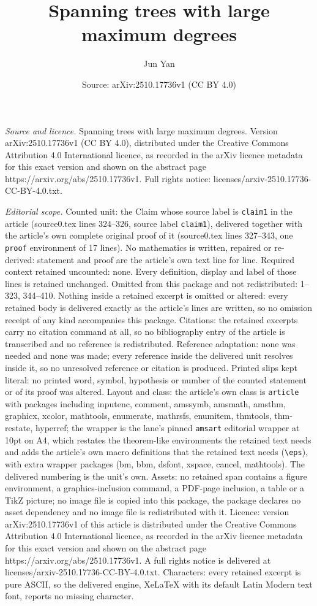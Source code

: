 \documentclass[10pt,a4paper]{amsart}
\title[Spanning trees with large maximum degrees]{Spanning trees with large maximum degrees}
\author{Jun Yan}
\date{Source: arXiv:2510.17736v1 (CC BY 4.0)}
\begin{document}
\maketitle

\noindent\emph{Source and licence.} Spanning trees with large maximum degrees. Version arXiv:2510.17736v1 (CC BY 4.0), distributed under the Creative Commons Attribution 4.0 International licence, as recorded in the arXiv licence metadata for this exact version and shown on the abstract page https://arxiv.org/abs/2510.17736v1. Full rights notice: licenses/arxiv-2510.17736-CC-BY-4.0.txt.\par\smallskip

\noindent\textit{Editorial scope.} Counted unit: the Claim whose source label is \texttt{claim1} in the article (source0.tex lines 324--326, source label \texttt{claim1}), delivered together with the article's own complete original proof of it (source0.tex lines 327--343, one \texttt{proof} environment of 17 lines). No mathematics is written, repaired or re-derived: statement and proof are the article's own text line for line. Required context retained uncounted: none. Every definition, display and label of those lines is retained unchanged. Omitted from this package and not redistributed: 1--323, 344--410. Nothing inside a retained excerpt is omitted or altered: every retained body is delivered exactly as the article's lines are written, so no omission receipt of any kind accompanies this package. Citations: the retained excerpts carry no citation command at all, so no bibliography entry of the article is transcribed and no reference is redistributed. Reference adaptation: none was needed and none was made; every reference inside the delivered unit resolves inside it, so no unresolved reference or citation is produced. Printed slips kept literal: no printed word, symbol, hypothesis or number of the counted statement or of its proof was altered. Layout and class: the article's own class is \texttt{article} with packages including inputenc, comment, amssymb, amsmath, amsthm, graphicx, xcolor, mathtools, enumerate, mathrsfs, enumitem, thmtools, thm-restate, hyperref; the wrapper is the lane's pinned \texttt{amsart} editorial wrapper at 10pt on A4, which restates the theorem-like environments the retained text needs and adds the article's own macro definitions that the retained text needs (\texttt{\textbackslash eps}), with extra wrapper packages (bm, bbm, dsfont, xspace, cancel, mathtools). The delivered numbering is the unit's own. Assets: no retained span contains a figure environment, a graphics-inclusion command, a PDF-page inclusion, a table or a TikZ picture; no image file is copied into this package, the package declares no asset dependency and no image file is redistributed with it. Licence: version arXiv:2510.17736v1 of this article is distributed under the Creative Commons Attribution 4.0 International licence, as recorded in the arXiv licence metadata for this exact version and shown on the abstract page https://arxiv.org/abs/2510.17736v1. A full rights notice is delivered at licenses/arxiv-2510.17736-CC-BY-4.0.txt. Characters: every retained excerpt is pure ASCII, so the delivered engine, XeLaTeX with its default Latin Modern text font, reports no missing character.
\end{document}
